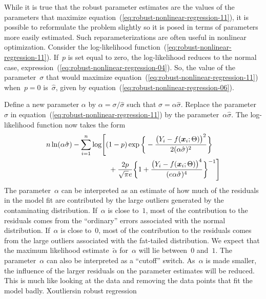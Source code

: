 \documentclass{admbmanual}
\begin{document}
While it is true that the robust parameter estimates are the values
of the parameters that maximize equation~(\ref{eq:robust-nonlinear-regression-11}), it is possible to
reformulate the problem slightly so it is posed in terms of
parameters more easily estimated. Such reparameterizations are often
useful in nonlinear optimization. 
Consider the log-likelihood function~(\ref{eq:robust-nonlinear-regression-11}). %
If~$p$
is set equal to zero, the log-likelihood reduces to the normal
case, expression~(\ref{eq:robust-nonlinear-regression-04}).
So, the value of the parameter~$\sigma$ that would
maximize equation~(\ref{eq:robust-nonlinear-regression-11}) 
when~$p=0$ is~$\hat\sigma$, given by equation~(\ref{eq:robust-nonlinear-regression-06}). %

Define a new parameter $\alpha$ by $\alpha=\sigma/\hat\sigma$ such that
  $\sigma=\alpha\hat\sigma$. 
Replace the parameter~$\sigma$ in equation~(\ref{eq:robust-nonlinear-regression-11})  %
by
the parameter~$\alpha\hat\sigma$. The log-likelihood function now takes the form
\begin{align}\label{eq:robust-nonlinear-regression-12} %
\nonumber
  n\ln(\alpha\hat\sigma)-\sum_{i=1}^n \log
    & \Bigg[
    (1-p)\exp\bigg\{-\frac{\big(Y_i-f({\mbox{\boldmath $x$}}_i;\Theta)\big)^2}{2(\alpha\hat\sigma)^2}
 \bigg\}\\
   &\quad + \frac{2p}{\sqrt{\pi}e}\bigg\{1+\frac{\big(Y_i-f({\mbox{\boldmath $x$}}_i;\Theta)\big)^4
     }{(e\alpha\hat\sigma)^4}\bigg\}^{-1}\Bigg]
\end{align}
The parameter~$\alpha$ can be interpreted as an estimate of how much of
the residuals in the model fit are contributed by the large
outliers generated by the contaminating distribution. If~$\alpha$
is close to~$1$, most of the contribution to the
residuals comes from the ``ordinary'' errors
associated with the normal distribution.
If~$\alpha$ is close to~$0$, most of the contribution to the residuals comes
from the large outliers associated with the fat-tailed
distribution. We expect that the maximum likelihood
estimate~$\tilde \alpha$ for~$\alpha$ will lie between~$0$ and~$1$. The parameter~$\alpha$
can also be interpreted as a ``cutoff'' switch. As~$\alpha$ is made smaller,
the influence of the larger residuals on the parameter estimates 
will be reduced. This
 is much like looking at the data and removing the data points that fit
the model badly.  
X{outliers}{in robust regression}
\end{document}
